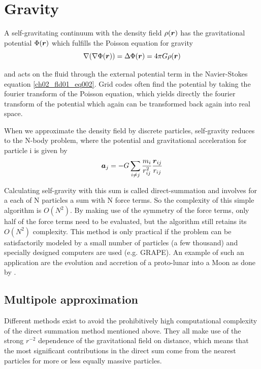 \section{Gravity}
A self-gravitating continuum with the density field $\rho(\boldsymbol{r})$ has the gravitational potential $\Phi(\boldsymbol{r})$ which fulfills the Poisson equation for gravity
\begin{equation}
\label{ch02_sph01_eq038}
\nabla ( \nabla \Phi(\boldsymbol{r}) ) = \Delta \Phi(\boldsymbol{r}) = 4 \pi G \rho(\boldsymbol{r})
\end{equation}

and acts on the fluid through the external potential term in the Navier-Stokes equation \ref{ch02_fld01_eq002}. Grid codes often find the potential by taking the fourier transform of the Poisson equation, which yields directly the fourier transform of the potential which again can be transformed back again into real space.

When we approximate the density field by discrete particles, self-gravity reduces to the N-body problem, where the potential and gravitational acceleration for particle i is given by
\begin{equation}
\label{ch02_sph01_eq038}
\boldsymbol{a}_j = - G \sum_{i \ne j} \frac{m_i}{r_{ij}^2} \frac{\boldsymbol{r}_{ij}}{r_{ij}} 
\end{equation}

Calculating self-gravity with this sum is called direct-summation and involves for a each of N particles a sum with N force terms. So the complexity of this simple algorithm is $O(N^2)$. By making use of the symmetry of the force terms, only half of the force terms need to be evaluated, but the algorithm still retains its $O(N^2)$ complexity. This method is only practical if the problem can be satisfactorily modeled by a small number of particles (a few thousand) and specially designed computers are used (e.g. GRAPE). An example of such an application are the evolution and accretion of a proto-lunar into a Moon as done by \cite{Kokubo:2000p2195}.

\subsection{Multipole approximation}
Different methods exist to avoid the prohibitively high computational complexity of the direct summation method mentioned above.  They all make use of the strong $r^{-2}$ dependence of the gravitational field on distance, which means that the most significant contributions in the direct sum come from the nearest particles for more or less equally massive particles. 


